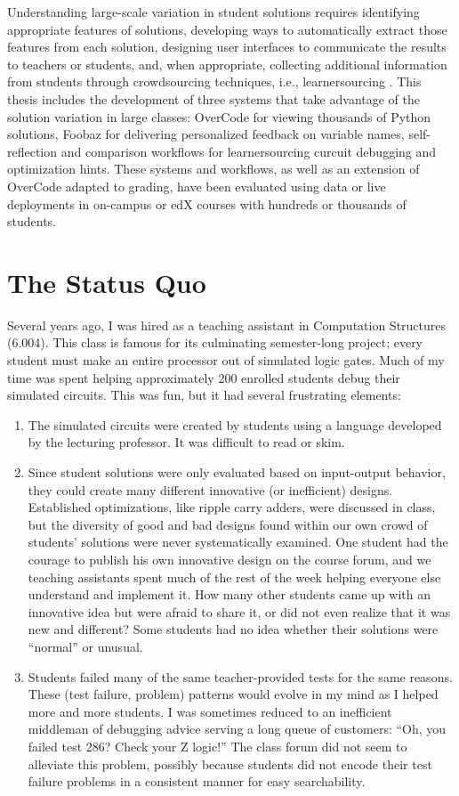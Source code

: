 Understanding large-scale variation in student solutions requires identifying appropriate features of solutions, developing ways to automatically extract those features from each solution, designing user interfaces to communicate the results to teachers or students, and, when appropriate, collecting additional information from students through crowdsourcing techniques, i.e., learnersourcing \cite{kim2013learnersourcing}. This thesis includes the development of three systems that take advantage of the solution variation in large classes: OverCode for viewing thousands of Python solutions, Foobaz for delivering personalized feedback on variable names, self-reflection and comparison workflows for learnersourcing curcuit debugging and optimization hints. These systems and workflows, as well as an extension of OverCode adapted to grading, have been evaluated using data or live deployments in on-campus or edX courses with hundreds or thousands of students.

\section{The Status Quo}

Several years ago, I was hired as a teaching assistant in Computation Structures (6.004). This class is famous for its culminating semester-long project; every student must make an entire processor out of simulated logic gates. Much of my time was spent helping approximately 200 enrolled students debug their simulated circuits. This was fun, but it had several frustrating elements:

\begin{enumerate}
\item The simulated circuits were created by students using a language developed by the lecturing professor. It was difficult to read or skim.
\item Since student solutions were only evaluated based on input-output behavior, they could create many different innovative (or inefficient) designs. Established optimizations, like ripple carry adders, were discussed in class, but the diversity of good and bad designs found within our own crowd of students' solutions were never systematically examined. One student had the courage to publish his own innovative design on the course forum, and we teaching assistants spent much of the rest of the week helping everyone else understand and implement it. How many other students came up with an innovative idea but were afraid to share it, or did not even realize that it was new and different? Some students had no idea whether their solutions were ``normal'' or unusual.
\item Students failed many of the same teacher-provided tests for the same reasons. These (test failure, problem) patterns would evolve in my mind as I helped more and more students. I was sometimes reduced to an inefficient middleman of debugging advice serving a long queue of customers: ``Oh, you failed test 286? Check your Z logic!'' The class forum did not seem to alleviate this problem, possibly because students did not encode their test failure problems in a consistent manner for easy searchability.
\end{enumerate}


